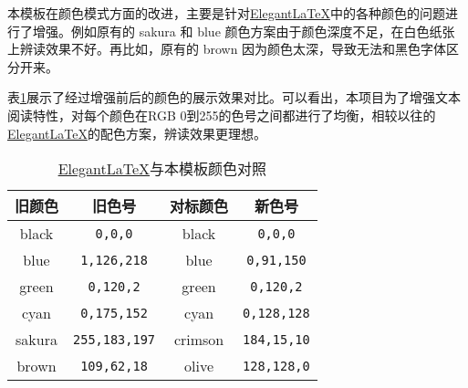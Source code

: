 本模板在颜色模式方面的改进，主要是针对\href{https://github.com/ElegantLaTeX/}{Elegant\LaTeX}中的各种颜色的问题进行了增强。例如原有的 \textcolor{elegantsakura}{sakura} 和 \textcolor{elegantblue}{blue} 颜色方案由于颜色深度不足，在白色纸张上辨读效果不好。再比如，原有的 \textcolor{elegantbrown}{brown} 因为颜色太深，导致无法和黑色字体区分开来。

表\ref{tab:colors}展示了经过增强前后的颜色的展示效果对比。可以看出，本项目为了增强文本阅读特性，对每个颜色在RGB 0到255的色号之间都进行了均衡，相较以往的\href{https://github.com/ElegantLaTeX/}{Elegant\LaTeX}的配色方案，辨读效果更理想。

\begin{table}[!h]
  \centering
  \caption{\href{https://github.com/ElegantLaTeX/}{Elegant\LaTeX}与本模板颜色对照}%
  \label{tab:colors}
  \begin{tabular}{c c c c}
    \toprule
    旧颜色 & 旧色号 & 对标颜色 & 新色号 \\
    \midrule
    \textcolor{elegantblack}{black} & \texttt{0,0,0} & \textcolor{eblack}{black} & \texttt{0,0,0} \\
    \textcolor{elegantblue}{blue} & \texttt{1,126,218} & \textcolor{eblue}{blue} & \texttt{0,91,150} \\
    \textcolor{elegantgreen}{green} & \texttt{0,120,2} & \textcolor{egreen}{green} & \texttt{0,120,2} \\
    \textcolor{elegantcyan}{cyan} & \texttt{0,175,152} & \textcolor{ecyan}{cyan} & \texttt{0,128,128} \\
    \textcolor{elegantsakura}{sakura} & \texttt{255,183,197} & \textcolor{ecrimson}{crimson} & \texttt{184,15,10} \\
    \textcolor{elegantbrown}{brown} & \texttt{109,62,18} & \textcolor{eolive}{olive} & \texttt{128,128,0} \\
    \bottomrule
  \end{tabular}
\end{table}